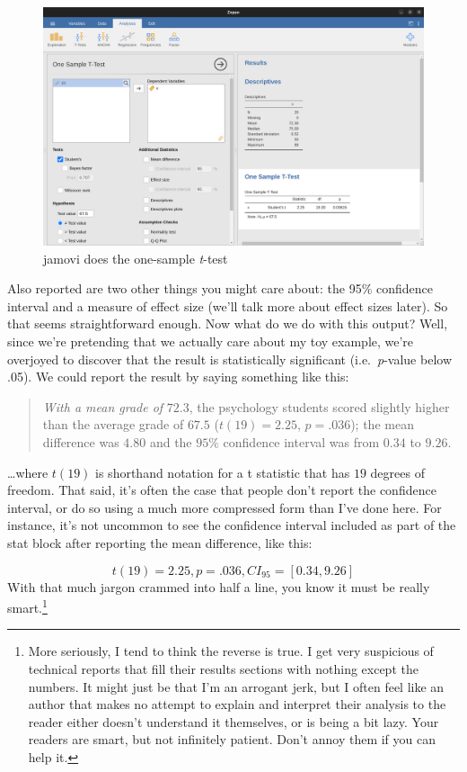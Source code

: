 \documentclass[
  a4paper,
]{book}
\begin{document}
\begin{figure}

\includegraphics[width=1\textwidth,height=\textheight]{images/fig11-6.png} \hfill{}

\caption{\label{fig-fig11-6}jamovi does the one-sample \emph{t}-test}

\end{figure}

Also reported are two other things you might care about: the 95\%
confidence interval and a measure of effect size (we'll talk more about
effect sizes later). So that seems straightforward enough. Now what do
we do with this output? Well, since we're pretending that we actually
care about my toy example, we're overjoyed to discover that the result
is statistically significant (i.e.~\emph{p}-value below .05). We could
report the result by saying something like this:

\begin{quote}
\emph{With a mean grade of} \(72.3\), the psychology students scored
slightly higher than the average grade of \(67.5\) (\(t(19) = 2.25\),
\(p = .036\)); the mean difference was \(4.80\) and the \(95\%\)
confidence interval was from \(0.34\) to \(9.26\).
\end{quote}

\ldots where \(t(19)\) is shorthand notation for a t statistic that has
\(19\) degrees of freedom. That said, it's often the case that people
don't report the confidence interval, or do so using a much more
compressed form than I've done here. For instance, it's not uncommon to
see the confidence interval included as part of the stat block after
reporting the mean difference, like this:

\[t(19)=2.25, p = .036, CI_{95} = [0.34, 9.26]\] With that much jargon
crammed into half a line, you know it must be really smart.\footnote{More
  seriously, I tend to think the reverse is true. I get very suspicious
  of technical reports that fill their results sections with nothing
  except the numbers. It might just be that I'm an arrogant jerk, but I
  often feel like an author that makes no attempt to explain and
  interpret their analysis to the reader either doesn't understand it
  themselves, or is being a bit lazy. Your readers are smart, but not
  infinitely patient. Don't annoy them if you can help it.}
\end{document}
